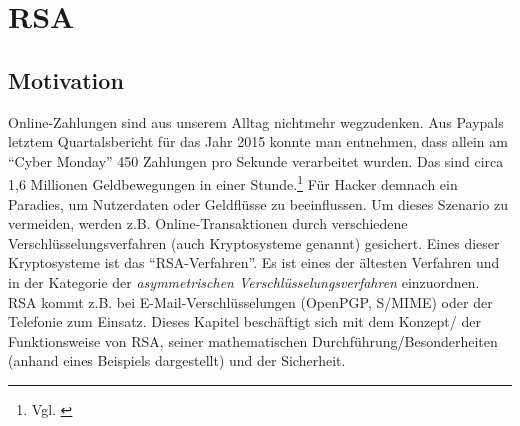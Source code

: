 \author{Autor: Patrick Künzel}
\chapter{\ac{RSA}}
\section{Motivation}
Online-Zahlungen sind aus unserem Alltag nichtmehr wegzudenken. Aus Paypals
letztem Quartalsbericht für das Jahr 2015 konnte man entnehmen, dass allein am
"`Cyber Monday"' 450 Zahlungen pro Sekunde verarbeitet wurden. Das sind circa
1,6 Millionen Geldbewegungen in einer Stunde.\footnote{Vgl. \citet{MotleyFool}}
Für Hacker demnach ein Paradies, um Nutzerdaten oder Geldflüsse zu beeinflussen.
Um dieses Szenario zu vermeiden, werden z.B. Online-Transaktionen durch
verschiedene Verschlüsselungsverfahren (auch Kryptosysteme genannt) gesichert.
Eines dieser Kryptosysteme ist das "`RSA-Verfahren"'. Es ist eines der
ältesten Verfahren und in der Kategorie der \emph{asymmetrischen
Verschlüsselungsverfahren} einzuordnen. RSA kommt z.B.
bei E-Mail-Verschlüsselungen (OpenPGP, S/MIME) oder der Telefonie zum Einsatz.
Dieses Kapitel beschäftigt sich mit dem Konzept/ der Funktionsweise von RSA,
seiner mathematischen Durchführung/Besonderheiten (anhand eines Beispiels
dargestellt) und der Sicherheit.
